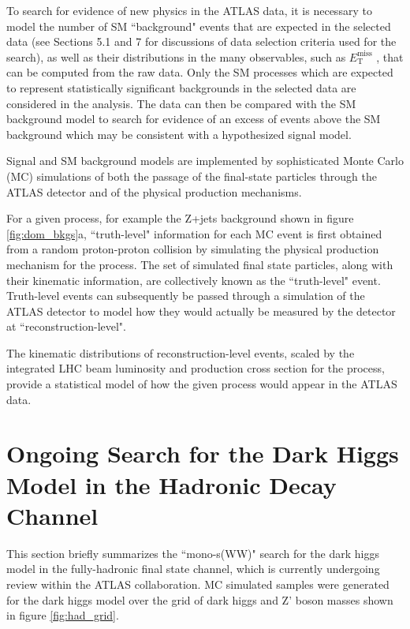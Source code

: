 \documentclass[12pt]{article}
\newcommand*{\met}{\ensuremath{E_\text{T}^\text{miss}} }
\begin{document}
To search for evidence of new physics in the ATLAS data, it is necessary to model the number of SM ``background" events that are expected in the selected data (see Sections 5.1 and 7 for discussions of data selection criteria used for the search), as well as their distributions in the many observables, such as \met, that can be computed from the raw data. Only the SM processes which are expected to represent statistically significant backgrounds in the selected data are considered in the analysis. The data can then be compared with the SM background model to search for evidence of an excess of events above the SM background which may be consistent with a hypothesized signal model.

Signal and SM background models are implemented by sophisticated Monte Carlo (MC) simulations of both the passage of the final-state particles through the ATLAS detector and of the physical production mechanisms. 

For a given process, for example the Z+jets background shown in figure \ref{fig:dom_bkgs}a, ``truth-level" information for each MC event is first obtained from a random proton-proton collision by simulating the physical production mechanism for the process. The set of simulated final state particles, along with their kinematic information, are collectively known as the ``truth-level" event. Truth-level events can subsequently be passed through a simulation of the ATLAS detector to model how they would actually be measured by the detector at ``reconstruction-level". 

The kinematic distributions of reconstruction-level events, scaled by the integrated LHC beam luminosity and production cross section for the process, provide a statistical model of how the given process would appear in the ATLAS data.

\section{Ongoing Search for the Dark Higgs Model in the Hadronic Decay Channel}

This section briefly summarizes the ``mono-s(WW)" search for the dark higgs model in the fully-hadronic final state channel, which is currently undergoing review within the ATLAS collaboration. MC simulated samples were generated for the dark higgs model over the grid of dark higgs and Z' boson masses shown in figure \ref{fig:had_grid}. 
\end{document}
